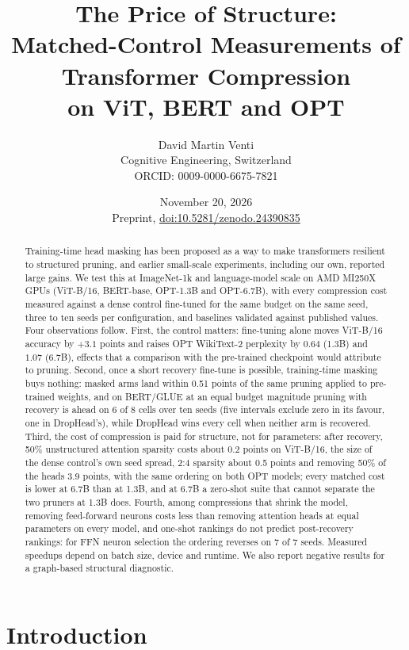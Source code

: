 \documentclass[11pt,a4paper]{article}
\title{The Price of Structure:\\ Matched-Control Measurements of Transformer Compression\\ on ViT, BERT and OPT}
\author{David Martin Venti\\
Cognitive Engineering, Switzerland\\
ORCID: 0009-0000-6675-7821}
\date{November 20, 2026\\[2pt]\small Preprint, \href{https://doi.org/10.5281/zenodo.24390835}{doi:10.5281/zenodo.24390835}}
\begin{document}
\maketitle

\begin{abstract}
Training-time head masking has been proposed as a way to make transformers resilient to structured pruning, and earlier small-scale experiments, including our own, reported large gains. We test this at ImageNet-1k and language-model scale on AMD MI250X GPUs (ViT-B/16, BERT-base, OPT-1.3B and OPT-6.7B), with every compression cost measured against a dense control fine-tuned for the same budget on the same seed, three to ten seeds per configuration, and baselines validated against published values. Four observations follow. First, the control matters: fine-tuning alone moves ViT-B/16 accuracy by $+3.1$ points and raises OPT WikiText-2 perplexity by $0.64$ (1.3B) and $1.07$ (6.7B), effects that a comparison with the pre-trained checkpoint would attribute to pruning. Second, once a short recovery fine-tune is possible, training-time masking buys nothing: masked arms land within 0.51 points of the same pruning applied to pre-trained weights, and on BERT/GLUE at an equal budget magnitude pruning with recovery is ahead on 6 of 8 cells over ten seeds (five intervals exclude zero in its favour, one in DropHead's), while DropHead wins every cell when neither arm is recovered. Third, the cost of compression is paid for structure, not for parameters: after recovery, 50\% unstructured attention sparsity costs about 0.2 points on ViT-B/16, the size of the dense control's own seed spread, 2:4 sparsity about 0.5 points and removing 50\% of the heads 3.9 points, with the same ordering on both OPT models; every matched cost is lower at 6.7B than at 1.3B, and at 6.7B a zero-shot suite that cannot separate the two pruners at 1.3B does. Fourth, among compressions that shrink the model, removing feed-forward neurons costs less than removing attention heads at equal parameters on every model, and one-shot rankings do not predict post-recovery rankings: for FFN neuron selection the ordering reverses on 7 of 7 seeds. Measured speedups depend on batch size, device and runtime. We also report negative results for a graph-based structural diagnostic.
\end{abstract}

\section{Introduction}
\end{document}
